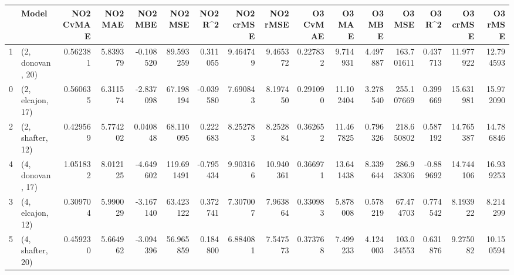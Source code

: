 \begin{tabular}{llrrrrrrrrrrrrrr}
\toprule
{} &             Model &  NO2 CvMAE &   NO2 MAE &   NO2 MBE &     NO2 MSE &   NO2 R\textasciicircum2 &  NO2 crMSE &   NO2 rMSE &  O3 CvMAE &     O3 MAE &    O3 MBE &      O3 MSE &    O3 R\textasciicircum2 &   O3 crMSE &    O3 rMSE \\
\midrule
1 &  (2, donovan, 20) &   0.562381 &  5.839379 & -0.108520 &   89.593259 &  0.311055 &   9.464749 &   9.465372 &  0.227832 &   9.714931 &  4.497887 &  163.701611 &  0.437713 &  11.977922 &  12.794593 \\
0 &  (2, elcajon, 17) &   0.560635 &  6.311574 & -2.837098 &   67.198194 & -0.039580 &   7.690843 &   8.197450 &  0.291090 &  11.102404 &  3.278540 &  255.107669 &  0.399669 &  15.631981 &  15.972090 \\
2 &  (2, shafter, 12) &   0.429569 &  5.774202 &  0.040848 &   68.110095 &  0.222683 &   8.252783 &   8.252884 &  0.362652 &  11.467825 &  0.796326 &  218.650802 &  0.587192 &  14.765387 &  14.786846 \\
4 &  (4, donovan, 17) &   1.051832 &  8.012125 & -4.649602 &  119.691491 & -0.795434 &   9.903166 &  10.940361 &  0.366971 &  13.641438 &  8.339644 &  286.938306 & -0.889692 &  14.744106 &  16.939253 \\
3 &  (4, elcajon, 12) &   0.309704 &  5.990029 & -3.167140 &   63.423122 &  0.372741 &   7.307007 &   7.963864 &  0.330983 &   5.878008 &  0.578219 &   67.474703 &  0.774542 &   8.193922 &   8.214299 \\
5 &  (4, shafter, 20) &   0.459230 &  5.664962 & -3.094396 &   56.965859 &  0.184800 &   6.884081 &   7.547573 &  0.373768 &   7.499233 &  4.124003 &  103.034553 &  0.631876 &   9.275082 &  10.150594 \\
\bottomrule
\end{tabular}
